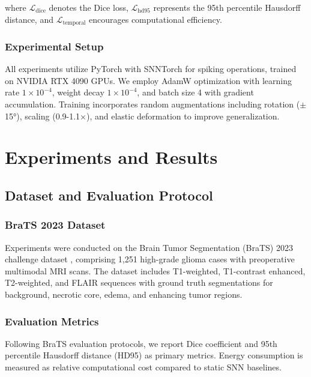 \documentclass[12pt,a4paper]{article}
\begin{document}
where $\mathcal{L}_{\text{dice}}$ denotes the Dice loss, $\mathcal{L}_{\text{hd95}}$ represents the 95th percentile Hausdorff distance, and $\mathcal{L}_{\text{temporal}}$ encourages computational efficiency.

\subsubsection{Experimental Setup}

All experiments utilize PyTorch with SNNTorch for spiking operations, trained on NVIDIA RTX 4090 GPUs. We employ AdamW optimization with learning rate $1 \times 10^{-4}$, weight decay $1 \times 10^{-4}$, and batch size 4 with gradient accumulation. Training incorporates random augmentations including rotation ($\pm$15°), scaling (0.9-1.1×), and elastic deformation to improve generalization.

\newpage
\section{Experiments and Results}
\label{sec:experiments}

\subsection{Dataset and Evaluation Protocol}

\subsubsection{BraTS 2023 Dataset}

Experiments were conducted on the Brain Tumor Segmentation (BraTS) 2023 challenge dataset \cite{bakas2017advancing, menze2015multimodal}, comprising 1,251 high-grade glioma cases with preoperative multimodal MRI scans. The dataset includes T1-weighted, T1-contrast enhanced, T2-weighted, and FLAIR sequences with ground truth segmentations for background, necrotic core, edema, and enhancing tumor regions.

\subsubsection{Evaluation Metrics}

Following BraTS evaluation protocols, we report Dice coefficient and 95th percentile Hausdorff distance (HD95) as primary metrics. Energy consumption is measured as relative computational cost compared to static SNN baselines.
\end{document}
